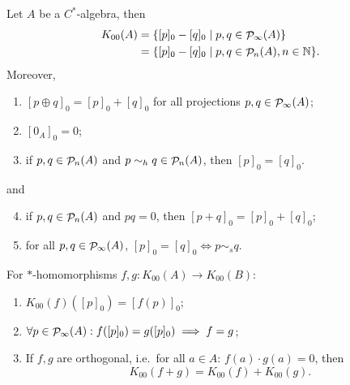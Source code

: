 \begin{proposition} \label{StandardPictureK00}
Let $A$ be a $C^*$-algebra, then
\begin{align*}
K_{00}(A) &= \setbuilder{[p]_0 - [q]_0}{p,q \in \Projections_\infty(A)} \\
&= \setbuilder{[p]_0 - [q]_0}{p,q \in \Projections_n(A), n\in \N}.
\end{align*}
Moreover,
\begin{enumerate}
\item $[p\oplus q]_0 = [p]_0+[q]_0$ for all projections $p,q\in\mathop{\mathcal{P}}\nolimits_\infty(A)$;
\item $[0_A]_0 = 0$;
\item if $p,q\in\mathop{\mathcal{P}}\nolimits_n(A)$ and $p\sim_h q \in \mathop{\mathcal{P}}\nolimits_n(A)$, then $[p]_0 = [q]_0$.
\end{enumerate}
and
\begin{enumerate}
\setcounter{enumi}{3}
\item if $p,q\in\mathop{\mathcal{P}}\nolimits_n(A)$ and $pq =0$, then $[p+q]_0 = [p]_0+[q]_0$;
\item for all $p,q\in\mathop{\mathcal{P}}\nolimits_\infty(A)$, $[p]_0 = [q]_0 \iff p\sim_s q$.
\end{enumerate}
For $*$-homomorphisms $f,g: K_{00}(A)\to K_{00}(B)$:
\begin{enumerate}
\item $K_{00}(f)([p]_0) = [f(p)]_0$;
\item $\forall p\in\mathop{\mathcal{P}}\nolimits_\infty(A): f([p]_0) = g([p]_0) \implies  f = g$;
\item If $f,g$ are orthogonal, i.e.\ for all $a\in A$: $f(a)\cdot g(a) = 0$, then
\[ K_{00}(f+g) = K_{00}(f)+K_{00}(g). \]
\end{enumerate}
\end{proposition}
